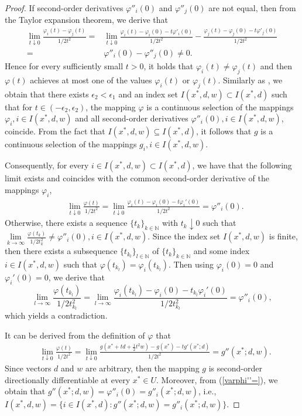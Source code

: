 \documentclass[11pt]{article}
\theoremstyle{definition}
\theoremstyle{remark}
\numberwithin{equation}{section}
\begin{document}
\begin{proof}
 If second-order  derivatives $\varphi''_i(0)$ and $\varphi''_j(0)$ are not equal, then from the Taylor expansion theorem,
 we derive that
 \begin{align*}
    \lim_{t\downarrow 0} \frac{\varphi_i(t)-\varphi_j(t)}{1/2t^2}
    =& \lim_{t\downarrow 0} \frac{\varphi_i(t)-\varphi_i(0)-t\varphi'_i(0)}{1/2t^2}
    -\frac{\varphi_j(t)-\varphi_j(0)-t \varphi'_j(0)}{1/2t^2}\\
    =&\varphi''_i(0)-\varphi''_j(0)\neq 0.
 \end{align*}
   Hence for every sufficiently small $t>0$, it holds that $\varphi_i(t)\neq \varphi_j(t)$ and then $\varphi(t)$ achieves at most one of the values $\varphi_i(t)$ or $\varphi_j(t)$.
 Similarly as \cite[Proposition 2.1]{Kuntz 94}, we obtain that there exists $\epsilon_2<\epsilon_1$ and an index set $I(x^*,d,w)\subset I(x^*,d)$ such that for $t\in (-\epsilon_2,\epsilon_2)$,
the mapping $\varphi$ is a continuous selection of the mappings $\varphi_i, i\in I(x^*,d,w)$ and all  second-order derivatives $\varphi''_i(0), i\in I(x^*,d,w)$, coincide.
 From the fact that $I(x^*,d,w)\subseteq I(x^*,d)$, it follows that $g$ is a continuous selection of the mappings $g_i, i\in I(x^*,d,w)$.



Consequently, for every $i\in I(x^*,d,w)\subset I(x^*,d)$, we have that
 the following limit  exists and coincides with the common second-order derivative of the mappings $\varphi_i$,
\begin{align}\label{varphi''=}
   & \lim_{t\downarrow 0}\frac{\varphi(t)}{1/2t^2}=
\lim\limits_{t\downarrow 0}\frac{\varphi_i(t)-\varphi_i(0)-t\varphi_i'(0)}{1/2t^2}=\varphi''_i(0).
\end{align}
Otherwise, there exists a sequence $\{t_k\}_{k\in \mathbb{N}}$ with $t_k\downarrow 0$ such that $\lim\limits_{k \to \infty}\frac{\varphi(t_k)}{1/2t_k^2}\neq \varphi''_i(0), i\in I(x^*,d,w)$. Since the index set $I(x^*,d,w)$ is finite, then there exists a subsequence $\{t_{k_l}\}_{l\in \mathbb{N}}$ of $\{t_k\}_{k\in \mathbb{N}}$ and  some index $i\in I(x^*,d,w)$ such that $\varphi(t_{k_l})=\varphi_i(t_{k_l})$. Then using $\varphi_i(0)=0$ and $\varphi_i'(0)=0$, we derive that
$$\lim\limits_{l \to \infty}\frac{\varphi(t_{k_l})}{1/2t_{k_l}^2}=
\lim\limits_{l \to \infty}\frac{\varphi_i(t_{k_l})-\varphi_i(0)-t_{k_l}\varphi_i'(0)}{1/2t_{k_l}^2}= \varphi''_i(0),$$
which yields a contradiction.

It can be derived from the definition of $\varphi$  that
\begin{align*}
  &\lim_{t\downarrow 0}\frac{\varphi(t)}{1/2t^2}=\lim_{t \downarrow0}\frac{g\left(x^*+td+\frac{1}{2}t^2w\right)-g(x^*)-tg'(x^*;d)}{1/2t^2}=g''(x^*;d,w).
\end{align*}
Since vectors $d$ and $w$ are arbitrary,
  then the mapping $g$ is second-order
directionally differentiable at every $x^*\in U$.
Moreover, from (\ref{varphi''=}), we obtain that $ g''(x^*;d,w)=\varphi''_i(0)=g''_i(x^*;d,w)$, i.e.,
  $I(x^*,d,w)=\{i\in I(x^*,d):g''(x^*;d,w)=g''_i(x^*;d,w)\}$.



\end{proof}
\end{document}
